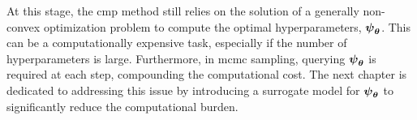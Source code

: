 \bigskip
At this stage, the \gls{cmp} method still relies on the solution of a generally non-convex optimization problem to compute the optimal hyperparameters, $\boldsymbol{\psi}_{\boldsymbol{\theta}}$. This can be a computationally expensive task, especially if the number of hyperparameters is large. Furthermore, in \gls{mcmc} sampling, querying $\boldsymbol{\psi}_{\boldsymbol{\theta}}$ is required at each step, compounding the computational cost. The next chapter is dedicated to addressing this issue by introducing a surrogate model for $\boldsymbol{\psi}_{\boldsymbol{\theta}}$ to significantly reduce the computational burden.